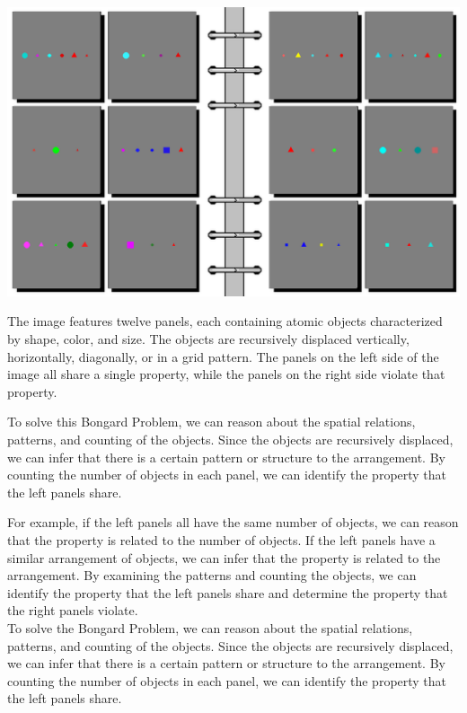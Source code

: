 \begin{tcolorbox}[breakable,enhanced jigsaw,opacityback=0,]
	\centering
	\includegraphics[width=.8\linewidth]{imgs/bongard/easy-11.png}\\
	\begin{dialogue}
		 The image features twelve panels, each containing atomic objects characterized by shape, color, and size. The objects are recursively displaced vertically, horizontally, diagonally, or in a grid pattern. The panels on the left side of the image all share a single property, while the panels on the right side violate that property.
		
		To solve this Bongard Problem, we can reason about the spatial relations, patterns, and counting of the objects. Since the objects are recursively displaced, we can infer that there is a certain pattern or structure to the arrangement. By counting the number of objects in each panel, we can identify the property that the left panels share.
		
		For example, if the left panels all have the same number of objects, we can reason that the property is related to the number of objects. If the left panels have a similar arrangement of objects, we can infer that the property is related to the arrangement. By examining the patterns and counting the objects, we can identify the property that the left panels share and determine the property that the right panels violate.
		\\
		 To solve the Bongard Problem, we can reason about the spatial relations, patterns, and counting of the objects. Since the objects are recursively displaced, we can infer that there is a certain pattern or structure to the arrangement. By counting the number of objects in each panel, we can identify the property that the left panels share.
		

\end{dialogue}
\end{tcolorbox}
